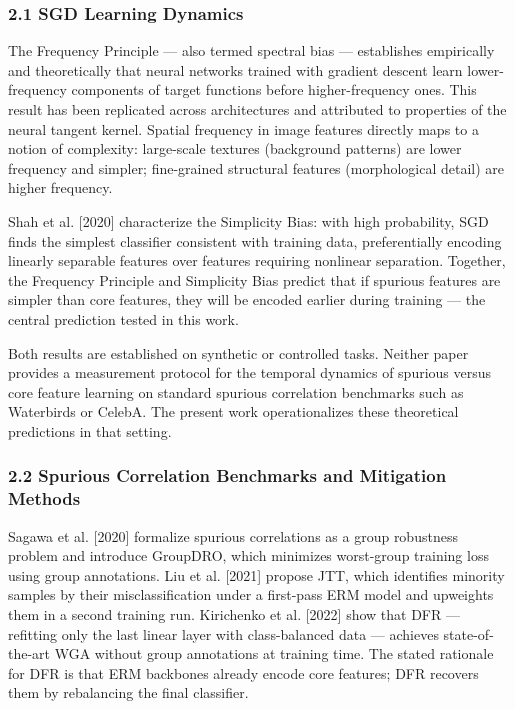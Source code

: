 
\subsubsection{2.1 SGD Learning Dynamics}

The Frequency Principle \citep{Xuetal2019} — also termed spectral bias \citep{Rahamanetal2019} — establishes empirically and theoretically that neural networks trained with gradient descent learn lower-frequency components of target functions before higher-frequency ones. This result has been replicated across architectures and attributed to properties of the neural tangent kernel. Spatial frequency in image features directly maps to a notion of complexity: large-scale textures (background patterns) are lower frequency and simpler; fine-grained structural features (morphological detail) are higher frequency.

Shah et al. [2020] characterize the Simplicity Bias: with high probability, SGD finds the simplest classifier consistent with training data, preferentially encoding linearly separable features over features requiring nonlinear separation. Together, the Frequency Principle and Simplicity Bias predict that if spurious features are simpler than core features, they will be encoded earlier during training — the central prediction tested in this work.

Both results are established on synthetic or controlled tasks. Neither paper provides a measurement protocol for the temporal dynamics of spurious versus core feature learning on standard spurious correlation benchmarks such as Waterbirds or CelebA. The present work operationalizes these theoretical predictions in that setting.

\subsubsection{2.2 Spurious Correlation Benchmarks and Mitigation Methods}

Sagawa et al. [2020] formalize spurious correlations as a group robustness problem and introduce GroupDRO, which minimizes worst-group training loss using group annotations. Liu et al. [2021] propose JTT, which identifies minority samples by their misclassification under a first-pass ERM model and upweights them in a second training run. Kirichenko et al. [2022] show that DFR — refitting only the last linear layer with class-balanced data — achieves state-of-the-art WGA without group annotations at training time. The stated rationale for DFR is that ERM backbones already encode core features; DFR recovers them by rebalancing the final classifier.

